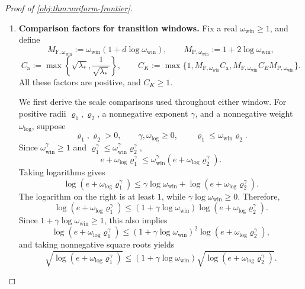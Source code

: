 \begin{proof}[Proof of \cref{obj:thm:uniform-frontier}]
\begin{enumerate}
For \(n\ge n_0\), positivity of \(n\) and \(d\) gives the exact identities
\[
n a_n^d
=n(n^{-1/d})^d
=n n^{-1}=1,
\qquad
F_n(a_n)=\frac{a_n}{\sqrt{\lambda_*}}.
\]
The choices \(C\ge\sqrt{\lambda_*}\) and
\(C\ge1/\sqrt{\lambda_*}\) therefore imply
\[
D_n=a_n\le C F_n(a_n),
\qquad
F_n(a_n)\le C D_n.
\]
For every \(\sigma\in[0,1/4]\), nonnegativity of the branches in
\cref{obj:def:frontier-rate} gives \(\rho_{n,\sigma}\ge0\). Hence enlarging the upper-bound constants preserves their inequalities:
\[
c\rho_{n,\sigma}\le R_n(\sigma)
\le C_R\rho_{n,\sigma}\le C\rho_{n,\sigma},
\]
\[
c\rho_{n,\sigma}\le H_n(\sigma)
\le C_H\rho_{n,\sigma}\le C\rho_{n,\sigma}.
\]
Together with the second-threshold bounds, this establishes the first group of assertions with one \(C\) and one \(n_0\).

\item \textbf{Comparison factors for transition windows.}
Fix a real \(\omega_{\mathrm{win}}\ge1\), and define
\[
M_{\mathrm F,\omega_{\mathrm{win}}}:=\omega_{\mathrm{win}}(1+d\log \omega_{\mathrm{win}}),
\qquad
M_{\mathrm P,\omega_{\mathrm{win}}}:=1+2\log \omega_{\mathrm{win}},
\]
\[
C_{\mathrm a}:=\max\left\{\sqrt{\lambda_*},
\frac1{\sqrt{\lambda_*}}\right\},
\qquad
C_K:=\max\{1,M_{\mathrm F,\omega_{\mathrm{win}}}C_{\mathrm a},
M_{\mathrm F,\omega_{\mathrm{win}}}C_EM_{\mathrm P,\omega_{\mathrm{win}}}\}.
\]
All these factors are positive, and \(C_K\ge1\).

We first derive the scale comparisons used throughout either window. For positive radii \(\varrho_1,\varrho_2\), a nonnegative exponent \(\gamma\), and a nonnegative weight \(\omega_{\log}\), suppose
\[
\varrho_1,\varrho_2>0,\qquad
\gamma,\omega_{\log}\ge0,\qquad
\varrho_1\le \omega_{\mathrm{win}}\varrho_2.
\]
Since \(\omega_{\mathrm{win}}^\gamma\ge1\) and
\(\varrho_1^\gamma\le \omega_{\mathrm{win}}^\gamma\varrho_2^\gamma\),
\[
e+\omega_{\log}\varrho_1^\gamma
\le \omega_{\mathrm{win}}^\gamma(e+\omega_{\log}\varrho_2^\gamma).
\]
Taking logarithms gives
\[
\log(e+\omega_{\log}\varrho_1^\gamma)
\le\gamma\log \omega_{\mathrm{win}}+
\log(e+\omega_{\log}\varrho_2^\gamma).
\]
The logarithm on the right is at least \(1\), while
\(\gamma\log \omega_{\mathrm{win}}\ge0\). Therefore,
\[
\log(e+\omega_{\log}\varrho_1^\gamma)
\le
(1+\gamma\log \omega_{\mathrm{win}})
\log(e+\omega_{\log}\varrho_2^\gamma).
\]
Since \(1+\gamma\log \omega_{\mathrm{win}}\ge1\), this also implies
\[
\log(e+\omega_{\log}\varrho_1^\gamma)
\le
(1+\gamma\log \omega_{\mathrm{win}})^2
\log(e+\omega_{\log}\varrho_2^\gamma),
\]
and taking nonnegative square roots yields
\[
\sqrt{\log(e+\omega_{\log}\varrho_1^\gamma)}
\le
(1+\gamma\log \omega_{\mathrm{win}})
\sqrt{\log(e+\omega_{\log}\varrho_2^\gamma)}.
\]


\end{enumerate}
\end{proof}
